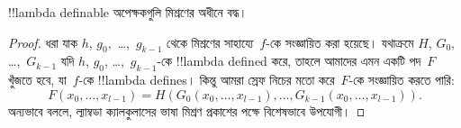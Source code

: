 \documentclass[../../../include/open-logic-section]{subfiles}
\begin{document}

\begin{lem}
!!{lambda definable} অপেক্ষকগুলি মিশ্রণের অধীনে বদ্ধ।
\end{lem}

\begin{proof}
ধরা যাক $h$, $g_0,$ \dots,~$g_{k-1}$ থেকে মিশ্রণের সাহায্যে~$f$-কে
সংজ্ঞায়িত করা হয়েছে। যথাক্রমে $H$, $G_0$, \dots,~$G_{k-1}$ যদি
$h$, $g_0$, \dots,~$g_{k-1}$-কে !!{lambda defined} করে, তাহলে আমাদের
এমন একটি পদ~$F$ খুঁজতে হবে, যা~$f$-কে !!{lambda define}s। কিন্তু আমরা
স্রেফ নিচের মতো করে~$F$-কে সংজ্ঞায়িত করতে পারি:
\[
F(x_0, \dots, x_{l-1}) = H(G_0(x_0, \dots, x_{l-1}),
\dots, G_{k-1}(x_0, \dots, x_{l-1})).
\]
অন্যভাবে বললে, ল্যাম্বডা ক্যালকুলাসের ভাষা মিশ্রণ প্রকাশের পক্ষে
বিশেষভাবে উপযোগী।
\end{proof}
\end{document}
